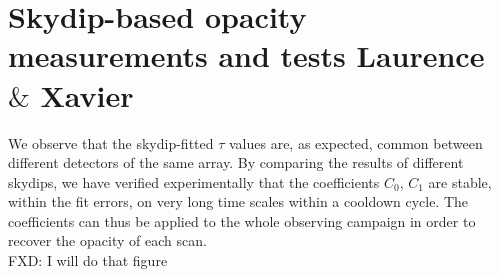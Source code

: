 



\section{Skydip-based opacity measurements and tests {\color{blue} Laurence $\&$ Xavier}}
\label{se:skydip-opacity_tests}

We observe that the skydip-fitted $\tau$ values are, as expected, common
between different detectors of the same array. By comparing the results of different skydips, we
have verified experimentally that the coefficients $C_0$, $C_1$ are stable,
within the fit errors, on very long time scales within a cooldown cycle. The
coefficients can thus be applied to the whole observing campaign in order to
recover the opacity of each scan.
\\ {\color{magenta} FXD: I will do that figure}

